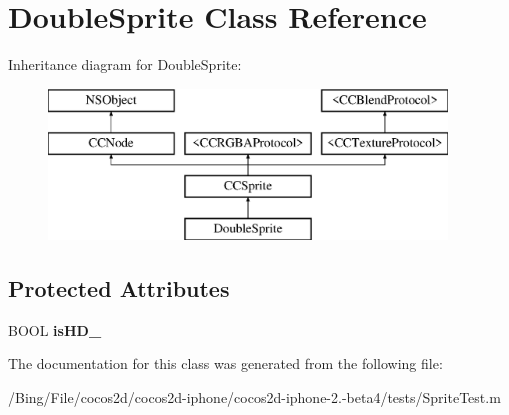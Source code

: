 \hypertarget{interface_double_sprite}{\section{Double\-Sprite Class Reference}
\label{interface_double_sprite}
}
Inheritance diagram for Double\-Sprite\-:\begin{figure}[H]
\begin{center}
\leavevmode
\includegraphics[height=4.000000cm]{interface_double_sprite}
\end{center}
\end{figure}
\subsection*{Protected Attributes}
\begin{DoxyCompactItemize}
\item 
\hypertarget{interface_double_sprite_a16ee9c885c601ea42a9c444cb6d9a3d3}{B\-O\-O\-L {\bfseries is\-H\-D\-\_\-}}\label{interface_double_sprite_a16ee9c885c601ea42a9c444cb6d9a3d3}

\end{DoxyCompactItemize}


The documentation for this class was generated from the following file\-:\begin{DoxyCompactItemize}
\item 
/\-Bing/\-File/cocos2d/cocos2d-\/iphone/cocos2d-\/iphone-\/2.-\/beta4/tests/Sprite\-Test.\-m\end{DoxyCompactItemize}
